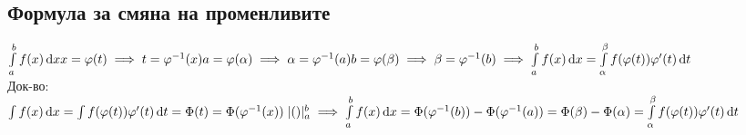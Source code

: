 \documentclass{article}
\newcommand{\dx}[1]{\,\mathrm{d}#1}
\newcommand{\intfromto}[2]{\int\limits_{#1}^{#2}}
\newcommand{\intfromatob}{\intfromto{a}{b}}
\begin{document}
    \subsection{Формула за смяна на променливите}
    \(\intfromatob f(x) \dx{x}\\
    x = \varphi(t) \implies t = \varphi^{-1}(x)\\
    a = \varphi(\alpha) \implies \alpha = \varphi^{-1}(a)\\
    b = \varphi(\beta) \implies \beta = \varphi^{-1}(b)\\
    \implies \intfromatob f(x) \dx{x} = \intfromto{\alpha}{\beta}f(\varphi(t)) \varphi'(t) \dx{t}\)\\
    Док-во:\\
    \(\int f(x) \dx{x} = \int f(\varphi(t)) \varphi'(t) \dx{t} = \Phi(t) = \Phi(\varphi^{-1}(x)) \; | ()|_a^b\\
    \implies \intfromatob f(x) \dx{x} = \Phi(\varphi^{-1}(b)) - \Phi(\varphi^{-1}(a)) = \Phi(\beta) - \Phi(\alpha) = \intfromto{\alpha}{\beta}f(\varphi(t)) \varphi'(t) \dx{t}\)
\end{document}
